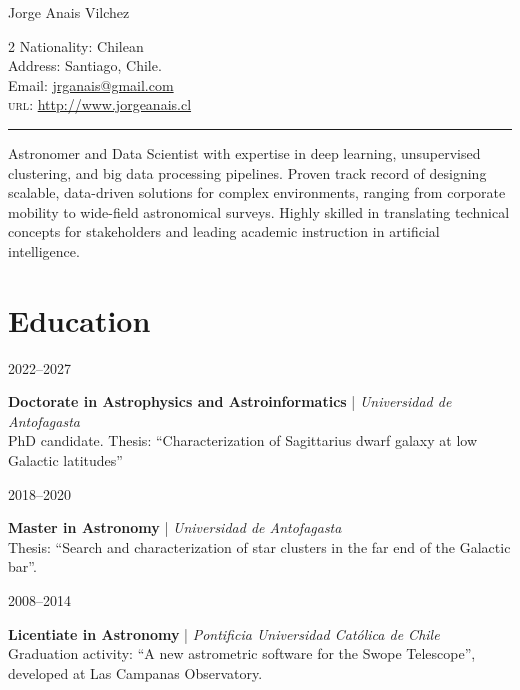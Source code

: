 \documentclass[10pt, a4paper]{article}
\newlength{\datebox}
\newlength{\textbox}
\newcommand{\eduitem}[4]{
    \noindent
    \parbox[t]{\datebox}{#1}%
    \parbox[t]{\textbox}{
        \textbf{\textcolor{ViridianGreen}{#2}} | \textit{#3}\\
        \textcolor{Jet}{\small #4}
    }\par\vspace{0.35cm}
}
\begin{document}
{\LARGE \textcolor{DarkCornflowerBlue}{Jorge Anais Vilchez}} \\

\begin{minipage}{\linewidth}
\begin{multicols}{2}
Nationality: Chilean\\
Address: Santiago, Chile.\\
\vfill\eject
Email: \href{mailto:jrganais@gmail.com}{jrganais@gmail.com}\\
\textsc{url}: \href{http://www.jorgeanais.cl}{http://www.jorgeanais.cl}\\
\end{multicols}
\end{minipage}

\hrule
\vspace{0.3cm}

\begin{flushright}
  \begin{minipage}{15cm}
  \textcolor{Jet}{\small Astronomer and Data Scientist with expertise in deep learning, unsupervised clustering, and big data processing pipelines. Proven track record of designing scalable, data-driven solutions for complex environments, ranging from corporate mobility to wide-field astronomical surveys. Highly skilled in translating technical concepts for stakeholders and leading academic instruction in artificial intelligence.}
  \end{minipage}
\end{flushright}

\section*{Education}
\eduitem{2022--2027}{Doctorate in Astrophysics and Astroinformatics}{Universidad de Antofagasta}{PhD candidate. Thesis: \enquote{Characterization of Sagittarius dwarf galaxy at low Galactic latitudes}}
\eduitem{2018--2020}{Master in Astronomy}{Universidad de Antofagasta}{Thesis: \enquote{Search and characterization of star clusters in the far end of the Galactic bar}.}
\eduitem{2008--2014}{Licentiate in Astronomy}{Pontificia Universidad Católica de Chile}{Graduation activity: \enquote{A new astrometric software for the Swope Telescope}, developed at Las Campanas Observatory.}
\end{document}
